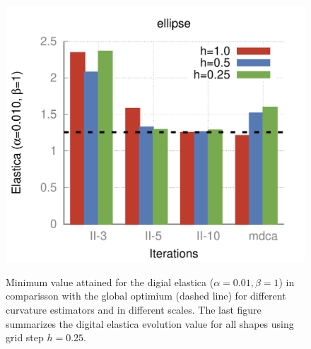 \begin{figure}[]
{\includegraphics[scale=0.4]{figures/chapter5/flow/plots/bars/length_pen_0.01000/ellipse.pdf}
}\hspace{1em}%
%
\caption{Minimum value attained for the digial elastica ($\alpha=0.01, \beta=1$) in comparisson with the global optimium (dashed line) for different curvature estimators and in different scales. The last figure summarizes the digital elastica evolution value for all shapes using grid step $h=0.25$.}
\label{fig:local-comb-estimators-plots-lp001}
\end{figure}

